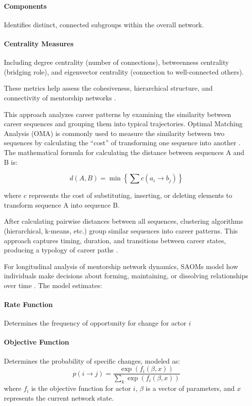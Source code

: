 \documentclass[main.tex]{subfiles}
\begin{document}
\paragraph{Components} Identifies distinct, connected subgroups within the overall network.

\paragraph{Centrality Measures} Including degree centrality (number of connections), betweenness centrality (bridging role), and eigenvector centrality (connection to well-connected others).

These metrics help assess the cohesiveness, hierarchical structure, and connectivity of mentorship networks \cite{cdc2015network}.

This approach analyzes career patterns by examining the similarity between career sequences and grouping them into typical trajectories. Optimal Matching Analysis (OMA) is commonly used to measure the similarity between two sequences by calculating the ``cost'' of transforming one sequence into another \cite{pmc2015mapping}. The mathematical formula for calculating the distance between sequences A and B is:

\[ d(A,B) = \min\left\{\sum c(a_i \rightarrow b_j)\right\} \]

where \( c \) represents the cost of substituting, inserting, or deleting elements to transform sequence A into sequence B.

After calculating pairwise distances between all sequences, clustering algorithms (hierarchical, k-means, etc.) group similar sequences into career patterns. This approach captures timing, duration, and transitions between career states, producing a typology of career paths \cite{misq2008career, pmc2015mapping}.

For longitudinal analysis of mentorship network dynamics, SAOMs model how individuals make decisions about forming, maintaining, or dissolving relationships over time \cite{oxford2012siena}. The model estimates:

\paragraph{Rate Function} Determines the frequency of opportunity for change for actor \( i \)

\paragraph{Objective Function} Determines the probability of specific changes, modeled as:
\[ p(i \rightarrow j) = \frac{\exp(f_i(\beta,x))}{\sum_k \exp(f_i(\beta,x))} \]
where \( f_i \) is the objective function for actor \( i \), \( \beta \) is a vector of parameters, and \( x \) represents the current network state.
\end{document}

